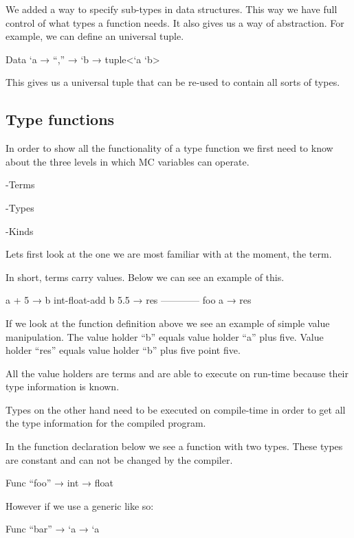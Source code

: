 We added a way to specify sub-types in data structures. 
This way we have full control of what types a function needs. 
It also gives us a way of abstraction. 
For example, we can define an universal tuple.

\begin{code}
	Data `a → “,” → `b → tuple<`a `b>
\end{code}

This gives us a universal tuple that can be re-used to contain all sorts of types.

\subsection{Type functions}

In order to show all the functionality of a type function we first need to know about the three levels in which  MC variables can operate.

-Terms 

-Types

-Kinds

Lets first look at the one we are most familiar with at the moment, the term.

In short, terms carry values. Below we can see an example of this.

\begin{code}
	a + 5 → b
	int-float-add b 5.5 → res
	------------
	foo a → res
\end{code}

If we look at the function definition above we see an example of simple value manipulation. The value holder “b” equals value holder “a” plus five. Value holder “res” equals value holder “b” plus five point five.

All the value holders are terms and are able to execute on run-time because their type information is known.

Types on the other hand need to be executed on compile-time in order to get all the type information for the compiled program.

In the function declaration below we see a function with two types. 
These types are constant and can not be changed by the compiler.

\begin{code}
	Func “foo” → int → float
\end{code}

However if we use a generic like so:

\begin{code}
	Func “bar” → `a → `a 
\end{code}

